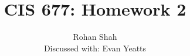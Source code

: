 \documentclass[12pt]{article}
\begin{document}
\pagestyle{plain}
\titleformat{\subsection}[runin]
  {\normalfont\large\bfseries}{\thesubsection}{1em}{}
\titleformat{\subsubsection}[runin]
  {\normalfont\large\bfseries}{\thesubsubsection}{1em}{}

\title{CIS 677: Homework 2}
\author{Rohan Shah\\Discussed with: Evan Yeatts}
\date{}

\maketitle
\end{document}
